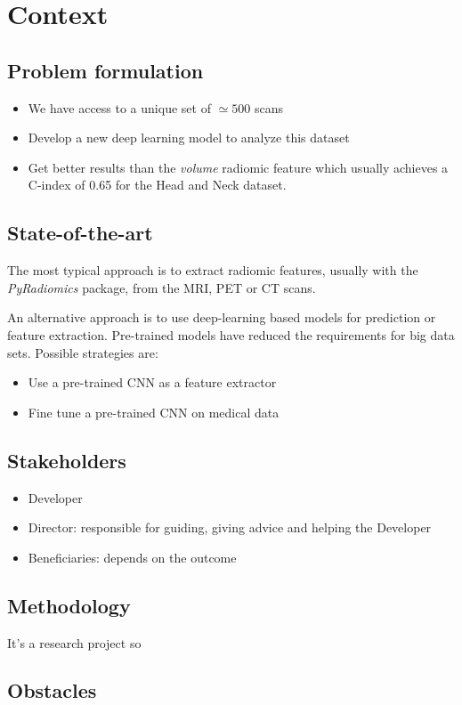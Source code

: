 \section{Context}
\subsection{Problem formulation}
\begin{frame}{\insertsubsec}
  \begin{itemize}
    \item We have access to a unique set of \( \simeq 500 \) scans
    \item Develop a new deep learning model to analyze this dataset
    \item Get better results than the \emph{volume} radiomic feature which usually achieves
    a C-index of 0.65 for the Head and Neck dataset. 
  \end{itemize}
\end{frame}

\subsection{State-of-the-art}
\begin{frame}{\insertsubsec}
  The most typical approach is to extract radiomic features, usually with
  the \emph{PyRadiomics} package, from the MRI, PET or CT scans.

  \vspace{.5cm}
  An alternative approach is to use deep-learning based models for prediction or 
  feature extraction. Pre-trained models have reduced the requirements for big data sets.
  Possible strategies are:
  \begin{itemize}
    \item Use a pre-trained CNN as a feature extractor
    \item Fine tune a pre-trained CNN on medical data
  \end{itemize}
  
\end{frame}

\subsection{Stakeholders}
\begin{frame}{\insertsubsec}
  \begin{itemize}
    \item Developer
    \item Director: responsible for guiding, giving advice and helping the Developer
    \item Beneficiaries: depends on the outcome
  \end{itemize}
\end{frame}

\subsection{Methodology}
\begin{frame}{\insertsubsec}
  It's a research project so
\end{frame}

\subsection{Obstacles}